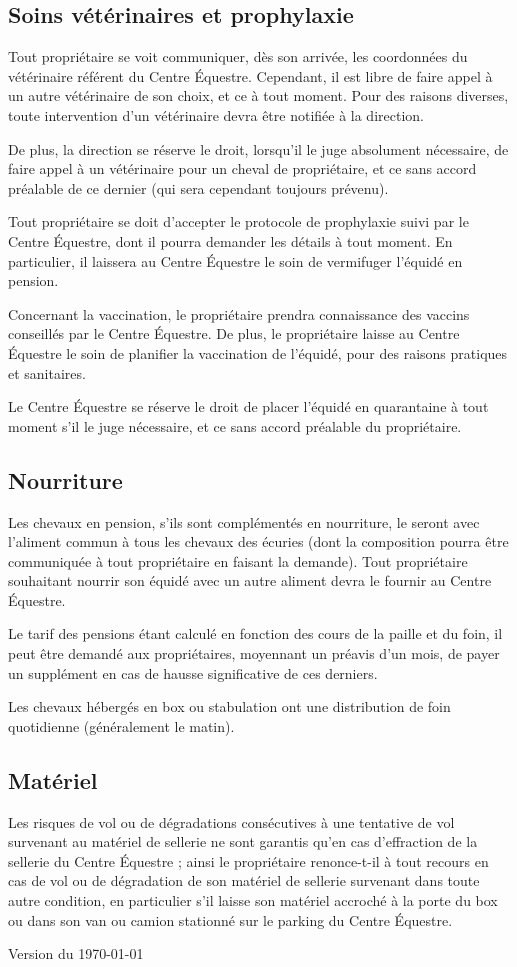 \documentclass[11pt,a4paper]{article}
\begin{document}
\subsection*{Soins vétérinaires et prophylaxie}
Tout propriétaire se voit communiquer, dès son arrivée, les coordonnées du vétérinaire référent du Centre Équestre. Cependant, il est libre de faire appel à un autre vétérinaire de son choix, et ce à tout moment. Pour des raisons diverses, toute intervention d'un vétérinaire devra être notifiée à la direction.

De plus, la direction se réserve le droit, lorsqu'il le juge absolument nécessaire, de faire appel à un vétérinaire pour un cheval de propriétaire, et ce sans accord préalable de ce dernier (qui sera cependant toujours prévenu).

Tout propriétaire se doit d'accepter le protocole de prophylaxie suivi par le Centre Équestre, dont il pourra demander les détails à tout moment. En particulier, il laissera au Centre Équestre le soin de vermifuger l'équidé en pension.

Concernant la vaccination, le propriétaire prendra connaissance des vaccins conseillés par le Centre Équestre. De plus, le propriétaire laisse au Centre Équestre le soin de planifier la vaccination de l'équidé, pour des raisons pratiques et sanitaires.

Le Centre Équestre se réserve le droit de placer l'équidé en quarantaine à tout moment s'il le juge nécessaire, et ce sans accord préalable du propriétaire.

\subsection*{Nourriture}
Les chevaux en pension, s'ils sont complémentés en nourriture, le seront avec l'aliment commun à tous les chevaux des écuries (dont la composition pourra être communiquée à tout propriétaire en faisant la demande). Tout propriétaire souhaitant nourrir son équidé avec un autre aliment devra le fournir au Centre Équestre.

Le tarif des pensions étant calculé en fonction des cours de la paille et du foin, il peut être demandé aux propriétaires, moyennant un préavis d'un mois, de payer un supplément en cas de hausse significative de ces derniers.

Les chevaux hébergés en box ou stabulation ont une distribution de foin quotidienne (généralement le matin).

\subsection*{Matériel}
Les risques de vol ou de dégradations consécutives à une tentative de vol survenant au matériel de sellerie ne sont garantis qu'en cas d'effraction de la sellerie du Centre Équestre ; ainsi le propriétaire renonce-t-il à tout recours en cas de vol ou de dégradation de son matériel de sellerie survenant dans toute autre condition, en particulier s'il laisse son matériel accroché à la porte du box ou dans son van ou camion stationné sur le parking du Centre Équestre.

\vfill
\begin{flushright}
	Version du \today
\end{flushright}
\end{document}
